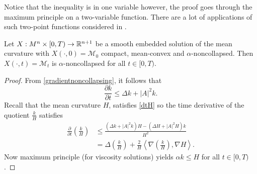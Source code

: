     \begin{remark}
        Notice that the inequality is in one variable however, the proof goes through the maximum principle on a two-variable function. There are a lot of applications of such two-point functions considered in \cite{brendle2014two,andrews2014moduli}.
    \end{remark}


\begin{corollary}
    [Noncollapsing]
    Let $ X: M^{n} \times [0,T) \to \mathbb{R}^{n+1} $ be a smooth embedded solution of the mean curvature with $ X(\cdot, 0) = \mathcal{M}_{0} $ compact, mean-convex and $ \alpha $-noncollapsed. Then $ X(\cdot,t) = \mathcal{M}_{t} $ is $ \alpha $-noncollapsed for all $t \in [0,T)  $. 
\end{corollary}
\begin{proof}
    From \cref{gradientnoncollapsing}, it follows that 
    \[ \frac{\partial k}{ \partial t} \le \Delta k + |A|^{2}k.\]
    Recall that the mean curvature $ H $, satisfies \cref{dtH} so the time derivative of the quotient $ \frac{k}{H} $ satisfies \begin{align*}
        \frac{\partial }{\partial t}\left( \frac{k}{H} \right)  & \le \frac{(\Delta k+|A|^{2}k)H - (\Delta H + |A|^{2}H)k}{H^{2}} \\
        & = \Delta \left( \frac{k}{H} \right) + \frac{2}{H}\left< \nabla \left( \frac{k}{H} \right), \nabla H \right>.
    \end{align*}
    Now maximum principle (for viscosity solutions) yields $ \alpha k \le H  $ for all $ t \in [0, T) $. 
  

    
\end{proof}